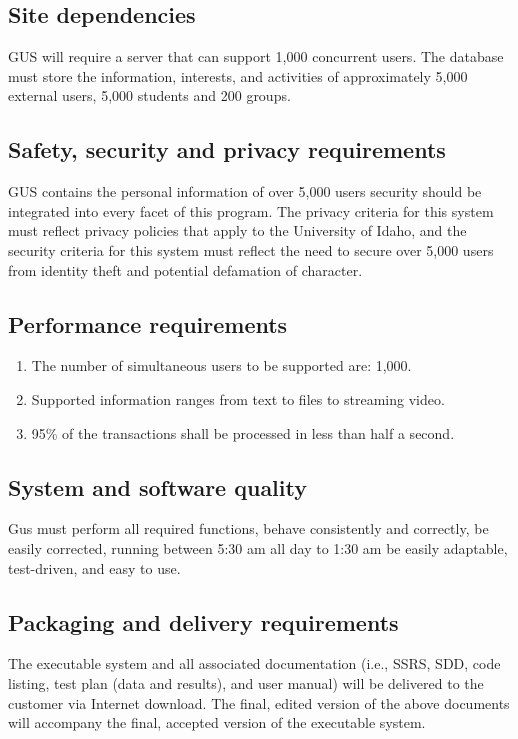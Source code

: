 \subsection{Site dependencies}
			GUS will require a server that can support 1,000 concurrent
			users.  The database must store the information, interests,
			and activities of approximately 5,000 external users, 5,000
			students and 200 groups.
		\subsection{Safety, security and privacy requirements}
			GUS contains the personal information of over 5,000 users
			security should be integrated into every facet of this
			program.  The privacy criteria for this system must reflect
			privacy policies that apply to the University of Idaho, and
			the security criteria for this system must reflect the need
			to secure over 5,000 users from identity theft and potential
			defamation of character.
		\subsection{Performance requirements}
		\begin{enumerate}
			\item The number of simultaneous users to be supported are: 1,000.
			\item Supported information ranges from text to files to streaming video.
			\item 95\% of the transactions shall be processed in less than half a second.
		\end{enumerate}
		\subsection{System and software quality}
			Gus must perform all required functions, behave consistently
			and correctly, be easily corrected, running between 5:30 am
			all day to 1:30 am be easily adaptable, test-driven, and easy
			to use.
		\subsection{Packaging and delivery requirements}
			The executable system and all associated documentation (i.e.,
			SSRS, SDD, code listing, test plan (data and results), and
			user manual) will be delivered to the customer via Internet
			download. The final, edited version of the above documents
			will accompany the final, accepted version of the executable system.
